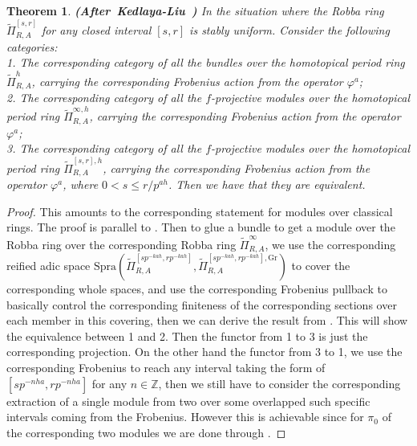 \documentclass[12pt]{amsart}
\newtheorem{theorem}{Theorem}[section]
\theoremstyle{definition}
\numberwithin{equation}{section}
\begin{document}
\begin{theorem} \mbox{\bf{(After Kedlaya-Liu \cite[Theorem 4.6.1]{KL2})}}
In the situation where the Robba ring $\widetilde{\Pi}^{[s,r]}_{R,A}$ for any closed interval $[s,r]$ is stably uniform. Consider the following categories:\\
1. The corresponding category of all the bundles over the homotopical period ring $\widetilde{\Pi}^h_{R,A}$, carrying the corresponding Frobenius action from the operator $\varphi^a$;\\
2. The corresponding category of all the $f$-projective modules over the homotopical period ring $\widetilde{\Pi}^{\infty,h}_{R,A}$, carrying the corresponding Frobenius action from the operator $\varphi^a$;\\
3. The corresponding category of all the $f$-projective modules over the homotopical period ring $\widetilde{\Pi}^{[s,r],h}_{R,A}$, carrying the corresponding Frobenius action from the operator $\varphi^a$, where $0<s\leq r/p^{ah}$.
Then we have that they are equivalent.
\end{theorem}


\begin{proof}
This amounts to the corresponding statement for modules over classical rings. The proof is parallel to \cite[Theorem 4.6.1]{KL2}. Then to glue a bundle to get a module over the Robba ring over the corresponding Robba ring $\widetilde{\Pi}_{R,A}^\infty$, we use the corresponding reified adic space $\mathrm{Spra}(\widetilde{\Pi}_{R,A}^{[sp^{-kah},rp^{-kah}]},\widetilde{\Pi}_{R,A}^{[sp^{-kah},rp^{-kah}],\mathrm{Gr}})$ to cover the corresponding whole spaces, and use the corresponding Frobenius pullback to basically control the corresponding finiteness of the corresponding sections over each member in this covering, then we can derive the result from \cite[Proposition 2.6.17, Corollary 2.6.10]{KL2}. This will show the equivalence between 1 and 2. Then the functor from 1 to 3 is just the corresponding projection. On the other hand the functor from 3 to 1, we use the corresponding Frobenius to reach any interval taking the form of $[sp^{-nha},rp^{-nha}]$ for any $n\in \mathbb{Z}$, then we still have to consider the corresponding extraction of a single module from two over some overlapped such specific intervals coming from the Frobenius. However this is achievable since for $\pi_0$ of the corresponding two modules we are done through \cite[Theorem 1.3.9]{KL1}. 	
\end{proof}
\end{document}
